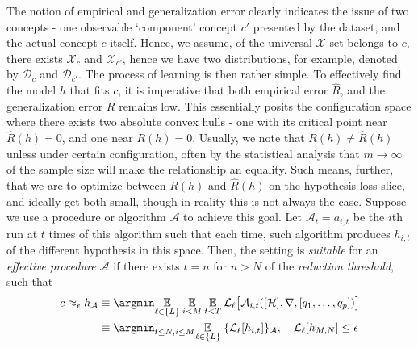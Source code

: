 The notion of empirical and generalization error clearly indicates the issue of two concepts - one observable `component' concept $c'$ presented by the dataset, and the actual concept $c$ itself. Hence, we assume, of the universal $\mathcal{X}$ set belongs to $c$, there exists $\mathcal{X}_{c}$ and $\mathcal{X}_{c'}$, hence we have two distributions, for example, denoted by $\mathcal{D}_{c}$ and $\mathcal{D}_{c'}$. The process of learning is then rather simple. To effectively find the model $h$ that fits $c$, it is imperative that both empirical error $\hat{R}$, and the generalization error $R$ remains low. This essentially posits the configuration space where there exists two absolute convex hulls - one with its critical point near $\hat{R}(h)=0$, and one near $R(h)=0$. Usually, we note that $R(h)\neq \hat{R}(h)$ unless under certain configuration, often by the statistical analysis that $m\to \infty$ of the sample size will make the relationship an equality. Such means, further, that we are to optimize between $R(h)$ and $\hat{R}(h)$ on the hypothesis-loss slice, and ideally get both small, though in reality this is not always the case. Suppose we use a procedure or algorithm $\mathcal{A}$ to achieve this goal. Let $\mathcal{A}_{t}=a_{i,t}$ be the $i$th run at $t$ times of this algorithm such that each time, such algorithm produces $h_{i,t}$ of the different hypothesis in this space. Then, the setting is \textit{suitable} for an \textit{effective procedure $\mathcal{A}$} if there exists $t=n$ for $n>N$ of the \textit{reduction threshold}, such that
\begin{equation}
     \begin{split}
        c \approx_{\epsilon} h_{\mathcal{A}} &\equiv \argmin \underset{\ell\in\{L\}}{\mathbb{E}}\:\underset{i< M}{\mathbb{E}}\:\underset{t<T}{\mathbb{E}} \: \mathcal{L}_{\ell} \big[ \mathcal{A}_{i,t}([\mathcal{H}],\nabla,[q_{1},\dots,q_{p}])  \big] \\ 
        & \equiv \argmin_{t\leq N, i \leq M} \underset{\ell\in\{L\}}{\mathbb{E}}\; \{ \mathcal{L}_{\ell}[h_{i,t}] \}_{\mathcal{A}} ,\quad \mathcal{L}_{\ell}[h_{M,N}]\leq \epsilon
     \end{split}
\end{equation}
